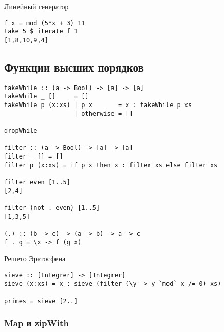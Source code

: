 \documentclass[a4paper,10pt]{article}
\begin{document}
Линейный генератор 
\begin{lstlisting}
f x = mod (5*x + 3) 11
take 5 $ iterate f 1
[1,8,10,9,4]
\end{lstlisting}

\subsection{Функции высших порядков}

\begin{lstlisting}
takeWhile :: (a -> Bool) -> [a] -> [a]
takeWhile _ []     = []
takeWhile p (x:xs) | p x       = x : takeWhile p xs
                   | otherwise = []

dropWhile

filter :: (a -> Bool) -> [a] -> [a]
filter _ [] = []
filter p (x:xs) = if p x then x : filter xs else filter xs

filter even [1..5]
[2,4]

filter (not . even) [1..5]
[1,3,5]

(.) :: (b -> c) -> (a -> b) -> a -> c
f . g = \x -> f (g x)
\end{lstlisting}

Решето Эратосфена

\begin{lstlisting}
sieve :: [Integrer] -> [Integrer]
sieve (x:xs) = x : sieve (filter (\y -> y `mod` x /= 0) xs)

primes = sieve [2..]
\end{lstlisting}

\clearpage

\subsubsection{Map и zipWith}
\end{document}
